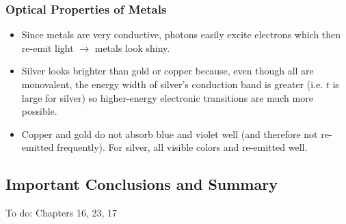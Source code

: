 \documentclass[10pt]{article}
\begin{document}
\subsubsection{Optical Properties of Metals}
\begin{itemize}
  \item Since metals are very conductive, photons easily excite electrons which then re-emit light $\rightarrow$ metals look shiny.
  \item Silver looks brighter than gold or copper because, even though all are monovalent, the energy width of silver's conduction
  band is greater (i.e. $t$ is large for silver) so higher-energy electronic transitions are much more possible.
  \item Copper and gold do not absorb blue and violet well (and therefore not re-emitted frequently). For silver, all visible colors and re-emitted well.
\end{itemize}

\subsection{Important Conclusions and Summary}

To do: Chapters 16, 23, 17
\end{document}
